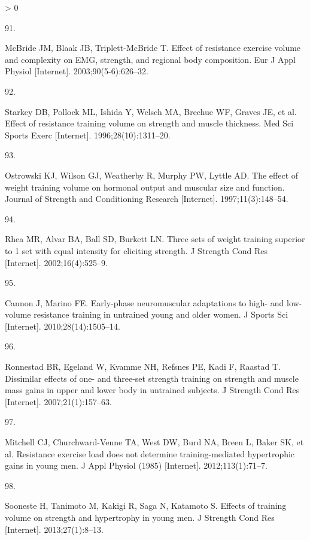 \documentclass[twoside,10pt]{gihclass} %
\newlength{\cslhangindent}
\newlength{\csllabelwidth}
\newenvironment{CSLReferences}[3] %
 {%
  \setlength{\parindent}{0pt}
  \ifodd #1 \everypar{\setlength{\hangindent}{\cslhangindent}}\ignorespaces\fi
  \ifnum #2 > 0
  \setlength{\parskip}{#2\baselineskip}
  \fi
 }%
 {}
\newcommand{\CSLLeftMargin}[1]{\parbox[t]{\maxof{\widthof{#1}}{\csllabelwidth}}{#1}}
\newcommand{\CSLRightInline}[1]{\parbox[t]{\linewidth}{#1}}
\begin{document}
\begin{CSLReferences}{0}{0}
\leavevmode\hypertarget{ref-RN1474}{}%
\CSLLeftMargin{91. }
\CSLRightInline{McBride JM, Blaak JB, Triplett-McBride T. Effect of resistance exercise volume and complexity on EMG, strength, and regional body composition. Eur J Appl Physiol {[}Internet{]}. 2003;90(5-6):626--32. }

\leavevmode\hypertarget{ref-RN1456}{}%
\CSLLeftMargin{92. }
\CSLRightInline{Starkey DB, Pollock ML, Ishida Y, Welsch MA, Brechue WF, Graves JE, et al. Effect of resistance training volume on strength and muscle thickness. Med Sci Sports Exerc {[}Internet{]}. 1996;28(10):1311--20. }

\leavevmode\hypertarget{ref-RN1454}{}%
\CSLLeftMargin{93. }
\CSLRightInline{Ostrowski KJ, Wilson GJ, Weatherby R, Murphy PW, Lyttle AD. The effect of weight training volume on hormonal output and muscular size and function. Journal of Strength and Conditioning Research {[}Internet{]}. 1997;11(3):148--54. }

\leavevmode\hypertarget{ref-RN1384}{}%
\CSLLeftMargin{94. }
\CSLRightInline{Rhea MR, Alvar BA, Ball SD, Burkett LN. Three sets of weight training superior to 1 set with equal intensity for eliciting strength. J Strength Cond Res {[}Internet{]}. 2002;16(4):525--9. }

\leavevmode\hypertarget{ref-RN1382}{}%
\CSLLeftMargin{95. }
\CSLRightInline{Cannon J, Marino FE. Early-phase neuromuscular adaptations to high- and low-volume resistance training in untrained young and older women. J Sports Sci {[}Internet{]}. 2010;28(14):1505--14. }

\leavevmode\hypertarget{ref-RN776}{}%
\CSLLeftMargin{96. }
\CSLRightInline{Ronnestad BR, Egeland W, Kvamme NH, Refsnes PE, Kadi F, Raastad T. Dissimilar effects of one- and three-set strength training on strength and muscle mass gains in upper and lower body in untrained subjects. J Strength Cond Res {[}Internet{]}. 2007;21(1):157--63. }

\leavevmode\hypertarget{ref-RN834}{}%
\CSLLeftMargin{97. }
\CSLRightInline{Mitchell CJ, Churchward-Venne TA, West DW, Burd NA, Breen L, Baker SK, et al. Resistance exercise load does not determine training-mediated hypertrophic gains in young men. J Appl Physiol (1985) {[}Internet{]}. 2012;113(1):71--7. }

\leavevmode\hypertarget{ref-RN1607}{}%
\CSLLeftMargin{98. }
\CSLRightInline{Sooneste H, Tanimoto M, Kakigi R, Saga N, Katamoto S. Effects of training volume on strength and hypertrophy in young men. J Strength Cond Res {[}Internet{]}. 2013;27(1):8--13. }


\end{CSLReferences}
\end{document}
